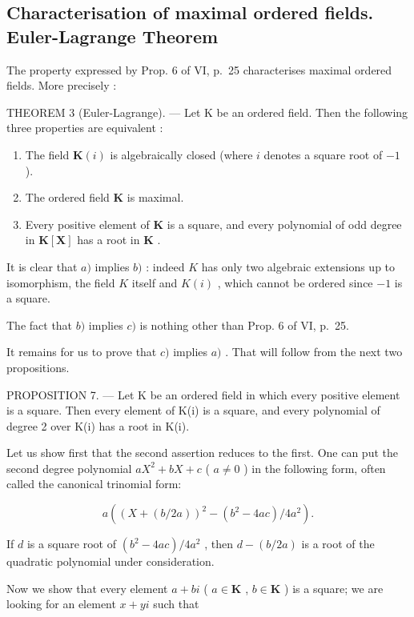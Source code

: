 \subsection{Characterisation of maximal ordered fields. Euler-Lagrange Theorem}

The property expressed by Prop. 6 of VI, p.~25 characterises maximal ordered fields. More precisely :

THEOREM 3 (Euler-Lagrange). --- Let K be an ordered field. Then the following three properties are equivalent :

\begin{enumerate}
\def\labelenumi{\alph{enumi})}
\item
  The field \(\mathbf{K}(i)\) is algebraically closed (where \(i\) denotes a square root of \(-1\) ).
\item
  The ordered field \(\mathbf{K}\) is maximal.
\item
  Every positive element of \(\mathbf{K}\) is a square, and every polynomial of odd degree in \(\mathbf{K}[\mathbf{X}]\) has a root in \(\mathbf{K}\) .
\end{enumerate}

It is clear that \(a)\) implies \(b)\) : indeed \(K\) has only two algebraic extensions up to isomorphism, the field \(K\) itself and \(K(i)\) , which cannot be ordered since \(-1\) is a square.

The fact that \(b)\) implies \(c)\) is nothing other than Prop. 6 of VI, p.~25.

It remains for us to prove that \(c)\) implies \(a)\) . That will follow from the next two propositions.

PROPOSITION 7. --- Let K be an ordered field in which every positive element is a square. Then every element of K(i) is a square, and every polynomial of degree 2 over K(i) has a root in K(i).

Let us show first that the second assertion reduces to the first. One can put the second degree polynomial \(aX^{2} + bX + c\) ( \(a \neq 0\) ) in the following form, often called the canonical trinomial form:

\[
a \left(\left(X + (b / 2 a)\right) ^ {2} - \left(b ^ {2} - 4 a c\right) / 4 a ^ {2}\right).
\]

If \(d\) is a square root of \((b^2 - 4ac) / 4a^2\) , then \(d - (b / 2a)\) is a root of the quadratic polynomial under consideration.

Now we show that every element \(a + bi\) ( \(a \in \mathbf{K}\) , \(b \in \mathbf{K}\) ) is a square; we are looking for an element \(x + yi\) such that

